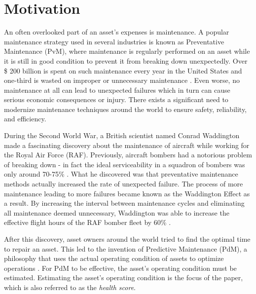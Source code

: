 \section*{Motivation}
An often overlooked part of an asset's expenses is maintenance.
A popular maintenance strategy used in several industries is known as Preventative Maintenance (PvM), 
where maintenance is regularly performed on an asset while it is still in good condition to prevent it from breaking down unexpectedly.
Over \$ 200 billion is spent on such maintenance every year in the United States and one-third is wasted on improper or unnecessary maintenance \cite{mobley2002introduction}.
Even worse, no maintenance at all can lead to unexpected failures which in turn can cause serious economic consequences or injury.
There exists a significant need to modernize maintenance techniques around the world to ensure safety, reliability, and efficiency.

During the Second World War, a British scientist named Conrad Waddington made a fascinating discovery about the maintenance of aircraft while working for the Royal Air Force (RAF).
Previously, aircraft bombers had a notorious problem of breaking down - in fact the ideal serviceability in a squadron of bombers was only around 70-75\% \cite{Morse1364}.
What he discovered was that preventative maintenance methods actually increased the rate of unexpected failure.
The process of more maintenance leading to more failures became known as the Waddington Effect as a result.
By increasing the interval between maintenance cycles and eliminating all maintenance deemed unnecessary,
Waddington was able to increase the effective flight hours of the RAF bomber fleet by 60\% \cite{Morse1364}.

After this discovery, asset owners around the world tried to find the optimal time to repair an asset.
This led to the invention of Predictive Maintenance (PdM), a philosophy that uses the actual operating condition of assets to optimize operations \cite{mobley2002introduction}.
For PdM to be effective, the asset's operating condition must be estimated.
Estimating the asset's operating condition is the focus of the paper, which is also referred to as the \textit{health score}.